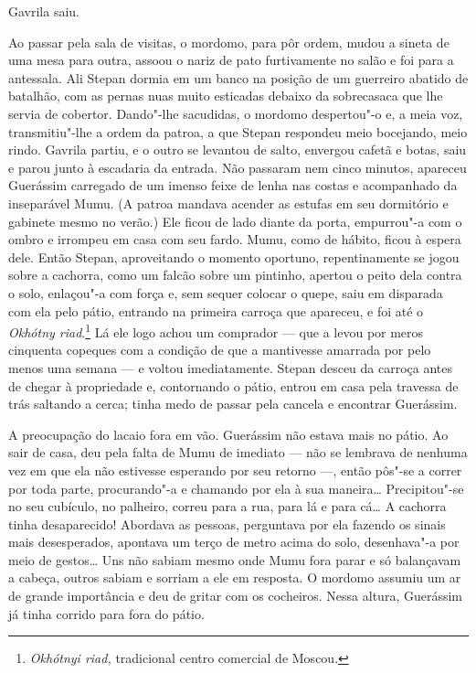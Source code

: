 Gavrila saiu.

Ao passar pela sala de visitas, o mordomo, para pôr ordem, mudou a
sineta de uma mesa para outra, assoou o nariz de pato furtivamente no
salão e foi para a antessala. Ali Stepan dormia em um banco na posição
de um guerreiro abatido de batalhão, com as pernas nuas muito esticadas
debaixo da sobrecasaca que lhe servia de cobertor. Dando"-lhe sacudidas,
o mordomo despertou"-o e, a meia voz, transmitiu"-lhe a ordem da patroa, a
que Stepan respondeu meio bocejando, meio rindo. Gavrila partiu, e o
outro se levantou de salto, envergou cafetã e botas, saiu e parou junto
à escadaria da entrada. Não passaram nem cinco minutos, apareceu
Guerássim carregado de um imenso feixe de lenha nas costas e acompanhado
da inseparável Mumu. (A patroa mandava acender as estufas em seu
dormitório e gabinete mesmo no verão.) Ele ficou de lado diante da
porta, empurrou"-a com o ombro e irrompeu em casa com seu fardo. Mumu,
como de hábito, ficou à espera dele. Então Stepan, aproveitando o
momento oportuno, repentinamente se jogou sobre a cachorra, como um
falcão sobre um pintinho, apertou o peito dela contra o solo, enlaçou"-a
com força e, sem sequer colocar o quepe, saiu em disparada com ela pelo
pátio, entrando na primeira carroça que apareceu, e foi até o
\emph{Okhótny riad}.\footnote{\emph{Okhótnyi riad,} tradicional
  centro comercial de Moscou.} Lá ele logo achou um comprador --- que a
levou por meros cinquenta copeques com a condição de que a mantivesse
amarrada por pelo menos uma semana --- e voltou imediatamente. Stepan
desceu da carroça antes de chegar à propriedade e, contornando o pátio,
entrou em casa pela travessa de trás saltando a cerca; tinha medo de
passar pela cancela e encontrar Guerássim.

A preocupação do lacaio fora em vão. Guerássim não estava mais no pátio.
Ao sair de casa, deu pela falta de Mumu de imediato --- não se lembrava
de nenhuma vez em que ela não estivesse esperando por seu retorno ---,
então pôs"-se a correr por toda parte, procurando"-a e chamando por ela à
sua maneira\ldots{} Precipitou"-se no seu cubículo, no palheiro, correu para a
rua, para lá e para cá\ldots{} A cachorra tinha desaparecido! Abordava as pessoas,
perguntava por ela fazendo os sinais mais desesperados, apontava um
terço de metro acima do solo, desenhava"-a por meio de gestos\ldots{} Uns não
sabiam mesmo onde Mumu fora parar e só balançavam a cabeça, outros
sabiam e sorriam a ele em resposta. O mordomo assumiu um ar de grande
importância e deu de gritar com os cocheiros. Nessa altura, Guerássim
já tinha corrido para fora do pátio.


